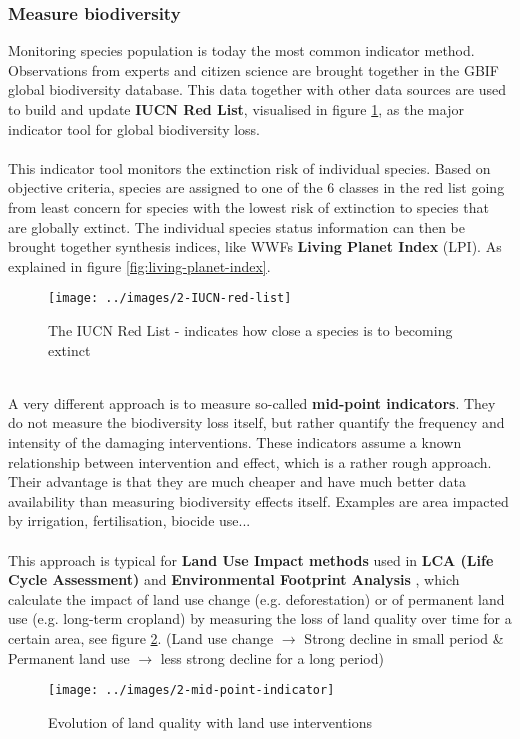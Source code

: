 \documentclass[../summary.tex]{subfiles}
\begin{document}
\subsubsection{Measure biodiversity}
Monitoring species population is today the most common indicator method. Observations from experts and citizen science are brought together in the GBIF global biodiversity database. This data together with other data sources are used to build and update \textbf{IUCN Red List}, visualised in figure \ref{fig:iucn-red-list}, as the major indicator tool for global biodiversity loss.
\\\\
This indicator tool monitors the extinction risk of individual species. Based on objective criteria, species are assigned to one of the 6 classes in the red list going from least concern for species with the lowest risk of extinction to species that are globally extinct. The individual species status information can then be brought together synthesis indices, like WWFs \textbf{Living Planet Index} (LPI). As explained in figure \ref{fig:living-planet-index}.

\begin{figure}[H]
	\centering
	\texttt{[image: ../images/2-IUCN-red-list]}
	\caption{The IUCN Red List - indicates how close a species is to becoming extinct}
	\label{fig:iucn-red-list}
\end{figure}

\newpage
\ \\
A very different approach is to measure so-called \textbf{mid-point indicators}. They do not measure the biodiversity loss itself, but rather quantify the frequency and intensity of the damaging interventions. These indicators assume a known relationship between intervention and effect, which is a rather rough approach. Their advantage is that they are much cheaper and have much better data availability than measuring biodiversity effects itself. Examples are area impacted by irrigation, fertilisation, biocide use...
\\\\
This approach is typical for \textbf{Land Use Impact methods} used in \textbf{LCA (Life Cycle Assessment)} and \textbf{Environmental Footprint Analysis} , which calculate the impact of land use change (e.g. deforestation) or of permanent land use (e.g. long-term cropland) by measuring the loss of land quality over time for a certain area, see figure \ref{fig:mid-point-indicator}.
(Land use change $\rightarrow$ Strong decline in small period \& Permanent land use $\rightarrow$ less strong decline for a long
period)
\begin{figure}[H]
	\centering
	\texttt{[image: ../images/2-mid-point-indicator]}
	\caption{Evolution of land quality with land use interventions}
	\label{fig:mid-point-indicator}
\end{figure}
\end{document}
